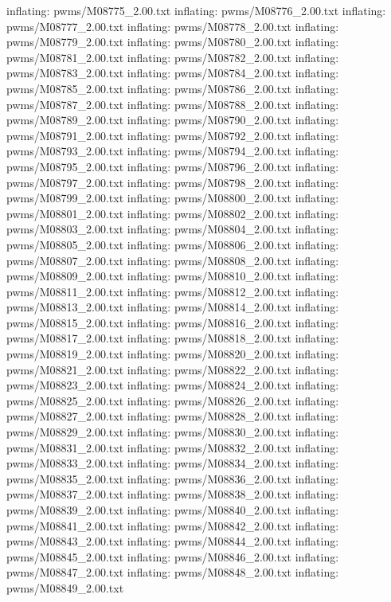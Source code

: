 \documentclass[letterpaper,10pt,english]{sphinxmanual}
\begin{document}
{\begin{sphinxVerbatim}[commandchars=\\\{\}]
  inflating: pwms/M08775\_2.00.txt
  inflating: pwms/M08776\_2.00.txt
  inflating: pwms/M08777\_2.00.txt
  inflating: pwms/M08778\_2.00.txt
  inflating: pwms/M08779\_2.00.txt
  inflating: pwms/M08780\_2.00.txt
  inflating: pwms/M08781\_2.00.txt
  inflating: pwms/M08782\_2.00.txt
  inflating: pwms/M08783\_2.00.txt
  inflating: pwms/M08784\_2.00.txt
  inflating: pwms/M08785\_2.00.txt
  inflating: pwms/M08786\_2.00.txt
  inflating: pwms/M08787\_2.00.txt
  inflating: pwms/M08788\_2.00.txt
  inflating: pwms/M08789\_2.00.txt
  inflating: pwms/M08790\_2.00.txt
  inflating: pwms/M08791\_2.00.txt
  inflating: pwms/M08792\_2.00.txt
  inflating: pwms/M08793\_2.00.txt
  inflating: pwms/M08794\_2.00.txt
  inflating: pwms/M08795\_2.00.txt
  inflating: pwms/M08796\_2.00.txt
  inflating: pwms/M08797\_2.00.txt
  inflating: pwms/M08798\_2.00.txt
  inflating: pwms/M08799\_2.00.txt
  inflating: pwms/M08800\_2.00.txt
  inflating: pwms/M08801\_2.00.txt
  inflating: pwms/M08802\_2.00.txt
  inflating: pwms/M08803\_2.00.txt
  inflating: pwms/M08804\_2.00.txt
  inflating: pwms/M08805\_2.00.txt
  inflating: pwms/M08806\_2.00.txt
  inflating: pwms/M08807\_2.00.txt
  inflating: pwms/M08808\_2.00.txt
  inflating: pwms/M08809\_2.00.txt
  inflating: pwms/M08810\_2.00.txt
  inflating: pwms/M08811\_2.00.txt
  inflating: pwms/M08812\_2.00.txt
  inflating: pwms/M08813\_2.00.txt
  inflating: pwms/M08814\_2.00.txt
  inflating: pwms/M08815\_2.00.txt
  inflating: pwms/M08816\_2.00.txt
  inflating: pwms/M08817\_2.00.txt
  inflating: pwms/M08818\_2.00.txt
  inflating: pwms/M08819\_2.00.txt
  inflating: pwms/M08820\_2.00.txt
  inflating: pwms/M08821\_2.00.txt
  inflating: pwms/M08822\_2.00.txt
  inflating: pwms/M08823\_2.00.txt
  inflating: pwms/M08824\_2.00.txt
  inflating: pwms/M08825\_2.00.txt
  inflating: pwms/M08826\_2.00.txt
  inflating: pwms/M08827\_2.00.txt
  inflating: pwms/M08828\_2.00.txt
  inflating: pwms/M08829\_2.00.txt
  inflating: pwms/M08830\_2.00.txt
  inflating: pwms/M08831\_2.00.txt
  inflating: pwms/M08832\_2.00.txt
  inflating: pwms/M08833\_2.00.txt
  inflating: pwms/M08834\_2.00.txt
  inflating: pwms/M08835\_2.00.txt
  inflating: pwms/M08836\_2.00.txt
  inflating: pwms/M08837\_2.00.txt
  inflating: pwms/M08838\_2.00.txt
  inflating: pwms/M08839\_2.00.txt
  inflating: pwms/M08840\_2.00.txt
  inflating: pwms/M08841\_2.00.txt
  inflating: pwms/M08842\_2.00.txt
  inflating: pwms/M08843\_2.00.txt
  inflating: pwms/M08844\_2.00.txt
  inflating: pwms/M08845\_2.00.txt
  inflating: pwms/M08846\_2.00.txt
  inflating: pwms/M08847\_2.00.txt
  inflating: pwms/M08848\_2.00.txt
  inflating: pwms/M08849\_2.00.txt

\end{sphinxVerbatim}}
\end{document}
